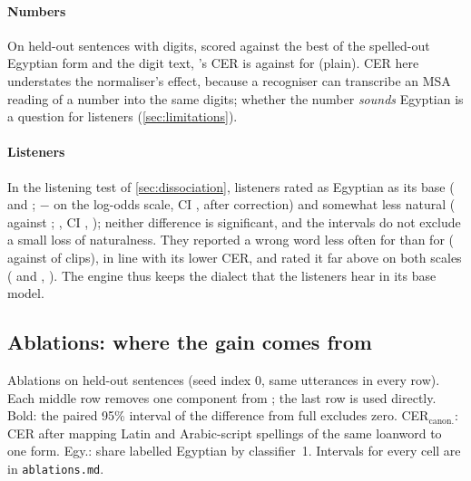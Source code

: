\paragraph{Numbers}
On held-out sentences with digits, scored against the best of the spelled-out Egyptian form and the digit text,
\BA's CER is  against  for \vox (plain). CER here
understates the normaliser's effect, because a recogniser can transcribe an MSA reading of a number into the same
digits; whether the number \emph{sounds} Egyptian is a question for listeners (\cref{sec:limitations}).

\paragraph{Listeners}
In the listening test of \cref{sec:dissociation}, listeners rated \BA as Egyptian as its base \vox (
and ; \BA $-$ \vox {} on the log-odds scale, CI
,  after correction) and somewhat less natural (
against ; , CI , );
neither difference is significant, and the intervals do not exclude a small loss of naturalness. They reported a
wrong word less often for \BA than for \vox ( against  of clips), in line with its lower
CER, and rated it far above \cbthree on both scales ( and ,
). The engine thus keeps the dialect that the listeners hear in its base model.

\subsection{Ablations: where the gain comes from}

\begin{table}[t]
\centering\small
\caption{Ablations on held-out sentences (seed index 0, same utterances in every row). Each middle row removes one
component from \BA; the last row is \vox used directly. Bold: the paired 95\% interval of the difference from full
\BA excludes zero. CER$_\text{canon.}$: CER after mapping Latin and Arabic-script spellings of the same loanword to
one form. Egy.: share labelled Egyptian by classifier~1. Intervals for every cell are in \texttt{ablations.md}.}
\label{tab:ablation}
\begin{adjustbox}{max width=\linewidth}
\end{adjustbox}
\end{table}

